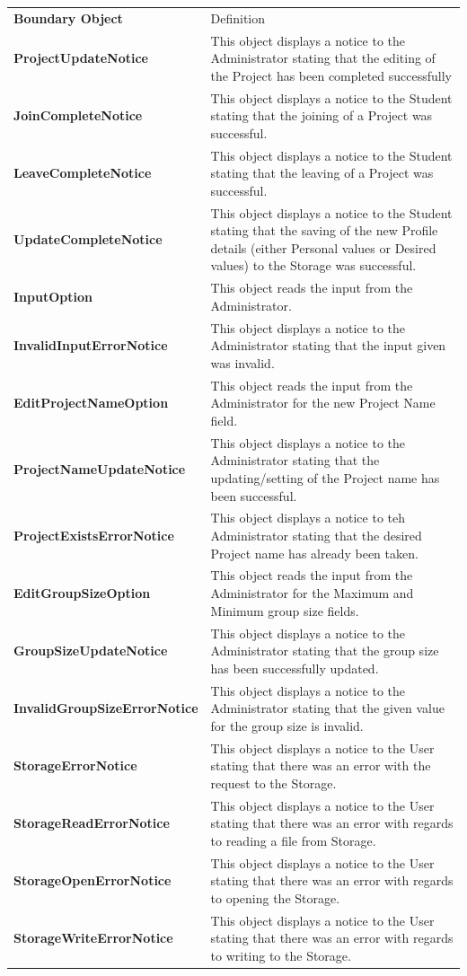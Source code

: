 \documentclass[12pt,letterpaper]{article}
\begin{document}
\begin{center}
\begin{tabu} to 
		\tableheader{}Boundary Object & Definition\\
		ProjectUpdateNotice & 
			This object displays a notice to the Administrator stating that the editing of the Project has been completed successfully\\
		JoinCompleteNotice & 
			This object displays a notice to the Student stating that the joining of a Project was successful.\\
		LeaveCompleteNotice & 
			This object displays a notice to the Student stating that the leaving of a Project was successful.\\
		UpdateCompleteNotice & 
			This object displays a notice to the Student stating that the saving of the new Profile details (either Personal values or Desired values) to the Storage was successful.\\
		InputOption & 
			This object reads the input from the Administrator.\\ %
		InvalidInputErrorNotice & 
			This object displays a notice to the Administrator stating that the input given was invalid.\\
		EditProjectNameOption & 
			This object reads the input from the Administrator for the new Project Name field.\\
		ProjectNameUpdateNotice & 
			This object displays a notice to the Administrator stating that the updating/setting of the Project name has been successful.\\
		ProjectExistsErrorNotice & 
			This object displays a notice to teh Administrator stating that the desired Project name has already been taken.\\
		EditGroupSizeOption & 
			This object reads the input from the Administrator for the Maximum and Minimum group size fields.\\
		GroupSizeUpdateNotice & 
			This object displays a notice to the Administrator stating that the group size has been successfully updated.\\
		InvalidGroupSizeErrorNotice & 
			This object displays a notice to the Administrator stating that the given value for the group size is invalid.\\
		StorageErrorNotice & 
			This object displays a notice to the User stating that there was an error with the request to the Storage.\\
		StorageReadErrorNotice & 
			This object displays a notice to the User stating that there was an error with regards to reading a file from Storage.\\
		StorageOpenErrorNotice & 
			This object displays a notice to the User stating that there was an error with regards to opening the Storage.\\
		StorageWriteErrorNotice & 
			This object displays a notice to the User stating that there was an error with regards to writing to the Storage.\\
\end{tabu}
\end{center}
\end{document}

